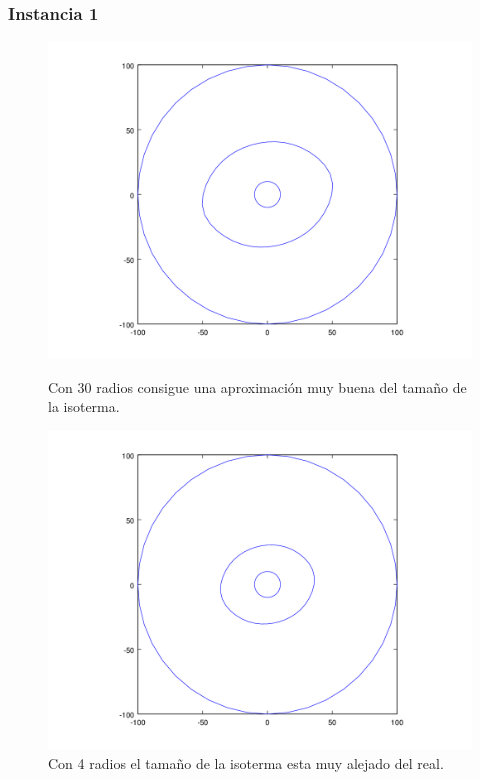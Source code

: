 \subsubsection{Instancia 1}

\begin{figure}[H]
\centering
\begin{minipage}{0.48\textwidth}
  \centering
    \includegraphics[width=1\textwidth]{imgs/comp_rads_bueno/comp_radss_iso5.png}
  \caption{\footnotesize{Con 30 radios consigue una aproximación muy buena del tamaño de la isoterma.}}
  \label{fig:Radios1}
\end{minipage}%
\hspace{0.03\textwidth}
\begin{minipage}{0.48\textwidth}   
  \centering
    \includegraphics[width=1\textwidth]{imgs/comp_rads_bueno/comp_radss_iso0.png} 
  \caption{\footnotesize{Con 4 radios el tamaño de la isoterma esta muy alejado del real.}}
  \label{fig:Radios2}
\end{minipage}
\end{figure}

